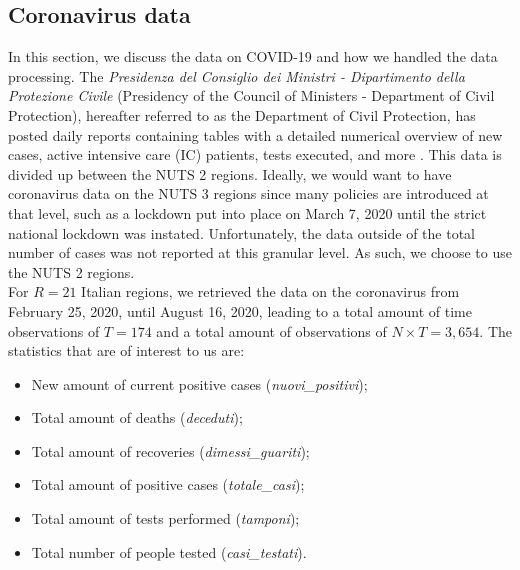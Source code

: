 \documentclass[12pt]{article}
\begin{document}
	\subsection{Coronavirus data} \label{subsec:coronavirus_data}
	In this section, we discuss the data on COVID-19 and how we handled the data processing. The \textit{Presidenza del Consiglio dei Ministri - Dipartimento della Protezione Civile} (Presidency of the Council of Ministers - Department of Civil Protection), hereafter referred to as the Department of Civil Protection, has posted daily reports containing tables with a detailed numerical overview of new cases, active intensive care (IC) patients, tests executed, and more \parencite{Rosini2020Github}. This data is divided up between the NUTS 2 regions. Ideally, we would want to have coronavirus data on the NUTS 3 regions since many policies are introduced at that level, such as a lockdown put into place on March 7, 2020 until the strict national lockdown was instated. Unfortunately, the data outside of the total number of cases was not reported at this granular level. As such, we choose to use the NUTS 2 regions. \\
	
	For $R=21$ Italian regions, we retrieved the data on the coronavirus from February 25, 2020, until August 16, 2020, leading to a total amount of time observations of $T=174$ and a total amount of observations of $N \times T = 3,654$. The statistics that are of interest to us are:
	\begin{itemize}
	    \item New amount of current positive cases (\textit{nuovi\_positivi});
	    \item Total amount of deaths (\textit{deceduti});
	    \item Total amount of recoveries (\textit{dimessi\_guariti});
	    \item Total amount of positive cases (\textit{totale\_casi});
	    \item Total amount of tests performed (\textit{tamponi});
	    \item Total number of people tested (\textit{casi\_testati}).
	\end{itemize}
	
\end{document}
